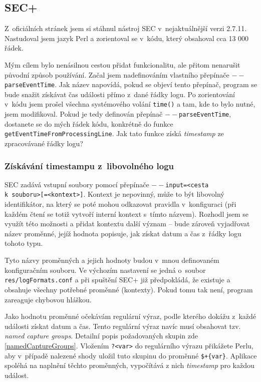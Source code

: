 \documentclass[thesis=B,czech]{FITthesis}[2012/06/26]
\begin{document}
\subsection{SEC+}
Z~oficiálních stránek \cite{secProgram} jsem si stáhnul nástroj SEC v~nejaktuálnější verzi 2.7.11. Nastudoval jsem jazyk Perl a zorientoval se v~kódu, který obsahoval cca 13 000 řádek. 

Mým cílem bylo nenásilnou cestou přidat funkcionalitu, ale přitom nenarušit původní způsob používání. Začal jsem nadefinováním vlastního přepínače \texttt{$--$parseEventTime}. Jak název napovídá, pokud se objeví tento přepínač, program se bude snažit získávat čas události přímo z~dané řádky logu. Po zorientování v~kódu jsem prošel všechna systémového volání \texttt{time()} a tam, kde to bylo nutné, jsem modifikoval. Pokud je tedy definován přepínač \texttt{$--$parseEventTime}, dostanete se do mých řádek kódu, konkrétně do funkce \texttt{getEventTimeFromProcessingLine}. Jak tato funkce získá \textit{timestamp} ze zpracovávané řádky logu? 

\subsubsection{Získávání timestampu z~libovolného logu}
SEC zadává vstupní soubory pomocí přepínače \texttt{$--$input=<cesta\\ k~souboru>[=<kontext>]}. Kontext je nepovinný, může to být libovolný identifikátor, na který se poté mohou odkazovat pravidla v~konfiguraci (při každém čtení se totiž vytvoří interní kontext s~tímto názvem). \cite{secManPage} Rozhodl jsem se využít této možnosti a přidat kontextu další význam -- bude zároveň vyjadřovat název proměnné, jejíž hodnota popisuje, jak získat datum a čas z~řádky logu tohoto typu. 

Tyto názvy proměnných a jejich hodnoty budou v~mnou definovaném konfiguračním souboru. Ve výchozím nastavení se jedná o~soubor \\ 
\texttt{res/logFormats.conf} a při spuštění SEC+ již předpokládá, že existuje a obsahuje všechny potřebné proměnné (kontexty). Pokud tomu tak není, program zareaguje chybovou hláškou.

Jako hodnotu proměnné očekávám regulární výraz, podle kterého dokážu z~každé události získat datum a čas. Tento regulární výraz navíc musí obsahovat tzv. \textit{named capture groups}. \cite{namedCaptureGroups} Detailní popis požadovaných skupin zde \ref{namedCaptureGroups}. Vložením \texttt{?<var>} do regulárního výrazu přikážete Perlu, aby v~případě nalezené shody uložil tuto skupinu do proměnné \texttt{\$+\{var\}}. Aplikace spoléhá na naplnění těchto proměnných, vypočítává z nich \textit{timestamp} pro každou událost. 
\end{document}
